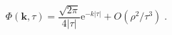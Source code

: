 \begin{equation}
\label{3-2c}
\Phi(\boldsymbol{k},\tau) = \frac{\sqrt{2 \pi}}{4|\tau|}
\mathrm{e}^{-k|\tau|} + O(\rho^2/\tau^3)\;.
\end{equation} 
